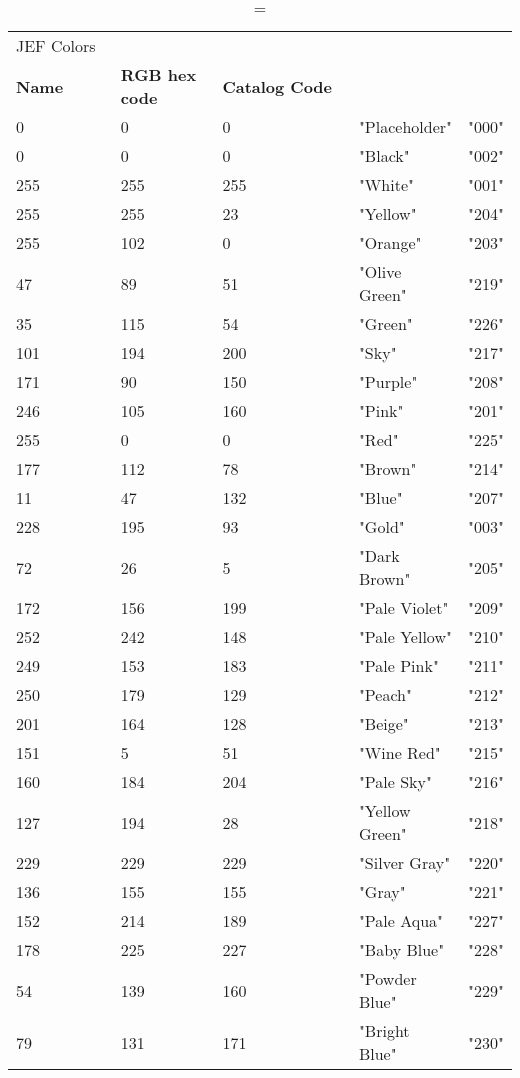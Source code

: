 
\begin{longtable}{p{0.3\linewidth} p{0.3\linewidth} p{0.4\linewidth}}
\caption = {JEF Colors}
\label{tblr:jef}\\
\textbf{Name} & \textbf{RGB hex code} & \textbf{Catalog Code} \\
0 &  0 &  0 &  "Placeholder" &  "000"\\
0 &  0 &  0 &  "Black" &  "002"\\
255 &  255 &  255 &  "White" &  "001"\\
255 &  255 &  23 &  "Yellow" &  "204"\\
255 &  102 &  0 &  "Orange" &  "203"\\
47 &  89 &  51 &  "Olive Green" &  "219"\\
35 &  115 &  54 &  "Green" &  "226"\\
101 &  194 &  200 &  "Sky" &  "217"\\
171 &  90 &  150 &  "Purple" &  "208"\\
246 &  105 &  160 &  "Pink" &  "201"\\
255 &  0 &  0 &  "Red" &  "225"\\
177 &  112 &  78 &  "Brown" &  "214"\\
11 &  47 &  132 &  "Blue" &  "207"\\
228 &  195 &  93 &  "Gold" &  "003"\\
72 &  26 &  5 &  "Dark Brown" &  "205"\\
172 &  156 &  199 &  "Pale Violet" &  "209"\\
252 &  242 &  148 &  "Pale Yellow" &  "210"\\
249 &  153 &  183 &  "Pale Pink" &  "211"\\
250 &  179 &  129 &  "Peach" &  "212"\\
201 &  164 &  128 &  "Beige" &  "213"\\
151 &  5 &  51 &  "Wine Red" &  "215"\\
160 &  184 &  204 &  "Pale Sky" &  "216"\\
127 &  194 &  28 &  "Yellow Green" &  "218"\\
229 &  229 &  229 &  "Silver Gray" &  "220"\\
136 &  155 &  155 &  "Gray" &  "221"\\
152 &  214 &  189 &  "Pale Aqua" &  "227"\\
178 &  225 &  227 &  "Baby Blue" &  "228"\\
54 &  139 &  160 &  "Powder Blue" &  "229"\\
79 &  131 &  171 &  "Bright Blue" &  "230"\\

\end{longtable}
